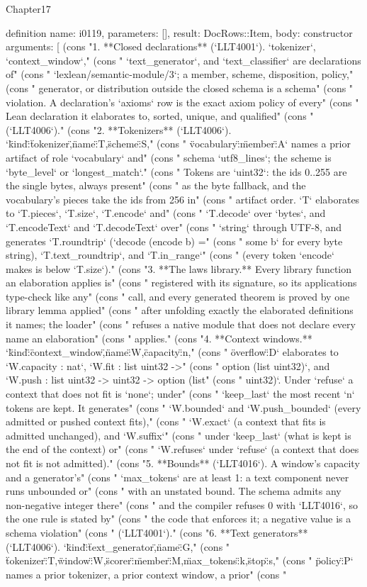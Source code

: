 \begin{lexlean}{Chapter17}
\begin{semanticmodule}
definition{
  name: i0119,
  parameters: [],
  result: DocRows::Item,
  body: constructor{
    arguments: [
      (cons "1. **Closed declarations** (`LLT4001`). `tokenizer`, `context_window`," (cons "   `text_generator`, and `text_classifier` are declarations of" (cons "   `lexlean/semantic-module/3`; a member, scheme, disposition, policy," (cons "   generator, or distribution outside the closed schema is a schema" (cons "   violation. A declaration's `axioms` row is the exact axiom policy of every" (cons "   Lean declaration it elaborates to, sorted, unique, and qualified" (cons "   (`LLT4006`)." (cons "2. **Tokenizers** (`LLT4006`). `{\"kind\":\"tokenizer\",\"name\":T,\"scheme\":S," (cons "   \"vocabulary\":{\"member\":A}}` names a prior artifact of role `vocabulary` and" (cons "   schema `utf8_lines`; the scheme is `byte_level` or `longest_match`." (cons "   Tokens are `uint32`: the ids 0..255 are the single bytes, always present" (cons "   as the byte fallback, and the vocabulary's pieces take the ids from 256 in" (cons "   artifact order. `T` elaborates to `T.pieces`, `T.size`, `T.encode` and" (cons "   `T.decode` over `bytes`, and `T.encodeText` and `T.decodeText` over" (cons "   `string` through UTF-8, and generates `T.roundtrip` (`decode (encode b) =" (cons "   some b` for every byte string), `T.text_roundtrip`, and `T.in_range`" (cons "   (every token `encode` makes is below `T.size`)." (cons "3. **The laws library.** Every library function an elaboration applies is" (cons "   registered with its signature, so its applications type-check like any" (cons "   call, and every generated theorem is proved by one library lemma applied" (cons "   after unfolding exactly the elaborated definitions it names; the loader" (cons "   refuses a native module that does not declare every name an elaboration" (cons "   applies." (cons "4. **Context windows.** `{\"kind\":\"context_window\",\"name\":W,\"capacity\":n," (cons "   \"overflow\":D}` elaborates to `W.capacity : nat`, `W.fit : list uint32 ->" (cons "   option (list uint32)`, and `W.push : list uint32 -> uint32 -> option (list" (cons "   uint32)`. Under `refuse` a context that does not fit is `none`; under" (cons "   `keep_last` the most recent `n` tokens are kept. It generates" (cons "   `W.bounded` and `W.push_bounded` (every admitted or pushed context fits)," (cons "   `W.exact` (a context that fits is admitted unchanged), and `W.suffix`" (cons "   under `keep_last` (what is kept is the end of the context) or" (cons "   `W.refuses` under `refuse` (a context that does not fit is not admitted)." (cons "5. **Bounds** (`LLT4016`). A window's capacity and a generator's" (cons "   `max_tokens` are at least 1: a text component never runs unbounded or" (cons "   with an unstated bound. The schema admits any non-negative integer there" (cons "   and the compiler refuses 0 with `LLT4016`, so the one rule is stated by" (cons "   the code that enforces it; a negative value is a schema violation" (cons "   (`LLT4001`)." (cons "6. **Text generators** (`LLT4006`). `{\"kind\":\"text_generator\",\"name\":G," (cons "   \"tokenizer\":T,\"window\":W,\"scorer\":{\"member\":M},\"max_tokens\":k,\"stop\":s," (cons "   \"policy\":P}` names a prior tokenizer, a prior context window, a prior" (cons " }}
\end{semanticmodule}
\end{lexlean}
